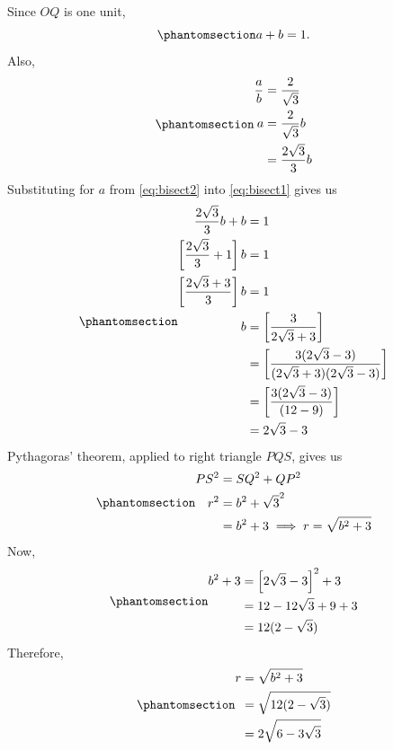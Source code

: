 \documentclass[
  a4paper,
]{article}
\begin{document}
Since \(OQ\) is one unit,
\begin{equation}\phantomsection\label{eq:bisect1}{
a+b = 1.
}\end{equation} Also, \begin{equation}\phantomsection\label{eq:bisect2}{
\begin{aligned}
\frac{a}{b} &= \frac{2}{\sqrt{3}}\\
a &= \frac{2}{\sqrt{3}}b\\
&= \frac{2\sqrt{3}}{3}b\\
\end{aligned}
}\end{equation} Substituting for \(a\) from \cref{eq:bisect2} into
\cref{eq:bisect1} gives us
\begin{equation}\phantomsection\label{eq:bisect3}{
\begin{aligned}
\frac{2\sqrt{3}}{3}b + b &= 1\\
\left[\frac{2\sqrt{3}}{3} + 1\right] b &= 1\\
\left[\frac{2\sqrt{3} + 3}{3}\right] b &= 1\\
b &= \left[\frac{3}{2\sqrt{3} + 3}\right]\\
&= \left[\frac{3(2\sqrt{3} - 3)}{(2\sqrt{3} + 3)(2\sqrt{3} - 3)}\right]\\
&= \left[\frac{3(2\sqrt{3} - 3)}{(12 - 9)}\right]\\
&= 2\sqrt{3} - 3\\
\end{aligned}
}\end{equation} Pythagoras' theorem, applied to right triangle \(PQS\),
gives us \begin{equation}\phantomsection\label{eq:bisect4}{
\begin{aligned}
PS^2 &= SQ^2 + QP^2\\
r^2 &= b^2 + \sqrt{3}^2\\
&= b^2 +3 \implies r = \sqrt{b^2 + 3}\\
\end{aligned}
}\end{equation} Now, \begin{equation}\phantomsection\label{eq:bisect5}{
\begin{aligned}
b^2 + 3 &= \left[{2\sqrt{3} - 3}\right]^2 + 3\\
&= {12 - 12\sqrt{3} + 9 + 3} \\
&= 12(2 - \sqrt{3})
\end{aligned}
}\end{equation} Therefore,
\begin{equation}\phantomsection\label{eq:bisect6}{
\begin{aligned}
r &= \sqrt{b^2 + 3}\\
&= \sqrt{12(2 - \sqrt{3})}\\
&=2\sqrt{6 - 3\sqrt{3}}\\
\end{aligned}
}\end{equation}
\end{document}
